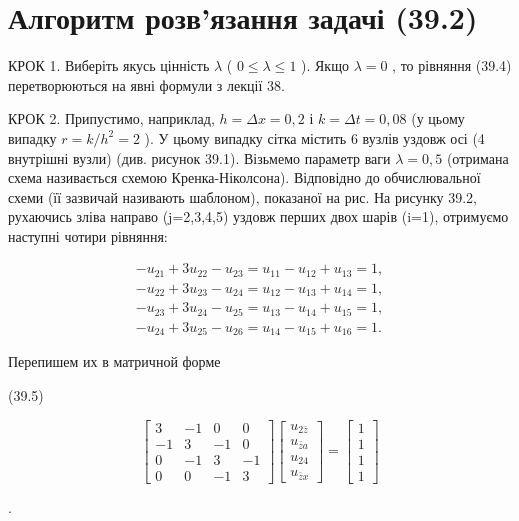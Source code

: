 \documentclass[
  ukrainian,
]{article}
\begin{document}
\section{Алгоритм розв'язання задачі
(39.2)}\label{ux430ux43bux433ux43eux440ux438ux442ux43c-ux440ux43eux437ux432ux44fux437ux430ux43dux43dux44f-ux437ux430ux434ux430ux447ux456-39.2}

КРОК 1. Виберіть якусь цінність \(\lambda\) ( \(0 \le \lambda \le 1\) ).
Якщо \(\lambda = 0\) , то рівняння (39.4) перетворюються на явні формули
з лекції 38.

КРОК 2. Припустимо, наприклад, \(h=\Delta x=0,2\) і \(k=\Delta t=0,08\)
(у цьому випадку \(r=k/h^2=2\) ). У цьому випадку сітка містить 6 вузлів
уздовж осі (4 внутрішні вузли) (див. рисунок 39.1). Візьмемо параметр
ваги \(\lambda=0,5\) (отримана схема називається схемою
Кренка-Ніколсона). Відповідно до обчислювальної схеми (її зазвичай
називають шаблоном), показаної на рис. На рисунку 39.2, рухаючись зліва
направо (j=2,3,4,5) уздовж перших двох шарів (i=1), отримуємо наступні
чотири рівняння:

\[
\begin{array}{l} -u_{21}+3u_{22}-u_{23}=u_{11}-u_{12}+u_{13}=1,\\ -u_{22}+3u_{23}-u_{24}=u_{12}-u_{13}+u_{14}=1,\\ -u_{23}+3u_{24}-u_{25}=u_{13}-u_{14}+u_{15}=1,\\ -u_{24}+3u_{25}-u_{26}=u_{14}-u_{15}+u_{16}=1. \end{array}
\]

Перепишем их в матричной форме

(39.5)

\[
\begin{bmatrix} 3 & -1 & 0 & 0 \\ -1 & 3 & -1 & 0 \\ 0 & -1 & 3 & -1 \\ 0 & 0 & -1 & 3 \end{bmatrix}
\begin{bmatrix} u_{2\bar{z}} \\ u_{\bar{z}a} \\ u_{24} \\ u_{\bar{z}x} \end{bmatrix}
=
\begin{bmatrix} 1 \\ 1 \\ 1 \\ 1 \end{bmatrix}
\]

.
\end{document}
